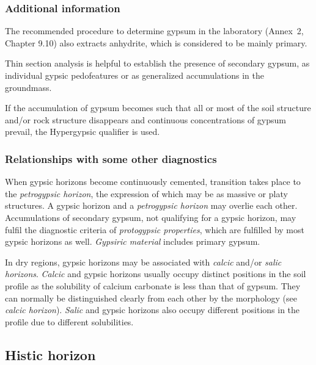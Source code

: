 \documentclass[
  letterpaper,
  DIV=11,
  numbers=noendperiod]{scrreprt}
\begin{document}
\hypertarget{additional-information-7}{%
\subsubsection{Additional information}\label{additional-information-7}}

The recommended procedure to determine gypsum in the laboratory
(Annex~2, Chapter 9.10) also extracts anhydrite, which is considered to
be mainly primary.

Thin section analysis is helpful to establish the presence of secondary
gypsum, as individual gypsic pedofeatures or as generalized
accumulations in the groundmass.

If the accumulation of gypsum becomes such that all or most of the soil
structure and/or rock structure disappears and continuous concentrations
of gypsum prevail, the Hypergypsic qualifier is used.

\hypertarget{relationships-with-some-other-diagnostics-13}{%
\subsubsection{Relationships with some other
diagnostics}\label{relationships-with-some-other-diagnostics-13}}

When gypsic horizons become continuously cemented, transition takes
place to the \emph{petrogypsic horizon}, the expression of which may be
as massive or platy structures. A gypsic horizon and a \emph{petrogypsic
horizon} may overlie each other. Accumulations of secondary gypsum, not
qualifying for a gypsic horizon, may fulfil the diagnostic criteria of
\emph{protogypsic properties}, which are fulfilled by most gypsic
horizons as well. \emph{Gypsiric material} includes primary gypsum.

In dry regions, gypsic horizons may be associated with \emph{calcic}
and/or \emph{salic horizons}. \emph{Calcic} and gypsic horizons usually
occupy distinct positions in the soil profile as the solubility of
calcium carbonate is less than that of gypsum. They can normally be
distinguished clearly from each other by the morphology (see
\emph{calcic horizon}). \emph{Salic} and gypsic horizons also occupy
different positions in the profile due to different solubilities.

\hypertarget{histic-horizon}{%
\subsection{Histic horizon}\label{histic-horizon}}
\end{document}
